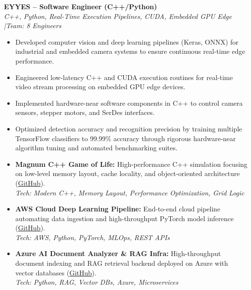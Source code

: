\documentclass[10pt,a4paper]{article}
\begin{document}
\vspace{0.15cm}
\textbf{EYYES -- Software Engineer (C++/Python)} \\
\textit{C++, Python, Real-Time Execution Pipelines, CUDA, Embedded GPU Edge \quad|\quad Team: 8 Engineers}
\begin{itemize}
    \item Developed computer vision and deep learning pipelines (Keras, ONNX) for industrial and embedded camera systems to ensure continuous real-time edge performance.
    \item Engineered low-latency C++ and CUDA execution routines for real-time video stream processing on embedded GPU edge devices.
    \item Implemented hardware-near software components in C++ to control camera sensors, stepper motors, and SerDes interfaces.
    \item Optimized detection accuracy and recognition precision by training multiple TensorFlow classifiers to 99.99\% accuracy through rigorous hardware-near algorithm tuning and automated benchmarking suites.
\end{itemize}


\begin{itemize}[leftmargin=1.5em, itemsep=0.2em]
    \item \textbf{Magnum C++ Game of Life:} High-performance C++ simulation focusing on low-level memory layout, cache locality, and object-oriented architecture (\href{https://github.com/CodeByMaxx/magnum-game-of-life}{GitHub}).\\
    \textit{Tech: Modern C++, Memory Layout, Performance Optimization, Grid Logic}
    \item \textbf{AWS Cloud Deep Learning Pipeline:} End-to-end cloud pipeline automating data ingestion and high-throughput PyTorch model inference (\href{https://github.com/CodeByMaxx/aws-pneumonia-detection}{GitHub}).\\
    \textit{Tech: AWS, Python, PyTorch, MLOps, REST APIs}
    \item \textbf{Azure AI Document Analyzer \& RAG Infra:} High-throughput document indexing and RAG retrieval backend deployed on Azure with vector databases (\href{https://github.com/CodeByMaxx/AI-Document-Analyzer}{GitHub}).\\
    \textit{Tech: Python, RAG, Vector DBs, Azure, Microservices}
\end{itemize}
\end{document}
